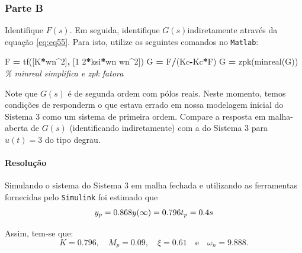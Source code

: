 \documentclass[
]{book}
\newenvironment{Shaded}{\begin{snugshade}}{\end{snugshade}}
\newcommand{\CommentTok}[1]{\textcolor[rgb]{0.56,0.35,0.01}{\textit{#1}}}
\newcommand{\FloatTok}[1]{\textcolor[rgb]{0.00,0.00,0.81}{#1}}
\newcommand{\NormalTok}[1]{#1}
\newcommand{\OperatorTok}[1]{\textcolor[rgb]{0.81,0.36,0.00}{\textbf{#1}}}
\newcommand{\VariableTok}[1]{\textcolor[rgb]{0.00,0.00,0.00}{#1}}
\theoremstyle{definition}
\theoremstyle{definition}
\theoremstyle{definition}
\theoremstyle{remark}
\begin{document}
\hypertarget{parte-b}{%
\subsubsection*{Parte B}\label{parte-b}}

Identifique \(F(s)\). Em seguida, identifique \(G(s)\)indiretamente através da equação \eqref{eq:eq55}. Para isto, utilize os seguintes comandos no \texttt{Matlab}:

\begin{Shaded}
\begin{Highlighting}[]
\VariableTok{F} \OperatorTok{=} \VariableTok{tf}\NormalTok{([}\VariableTok{K}\OperatorTok{*}\VariableTok{wn}\OperatorTok{\^{}}\FloatTok{2}\NormalTok{]}\OperatorTok{,}\NormalTok{ [}\FloatTok{1} \FloatTok{2}\OperatorTok{*}\VariableTok{ksi}\OperatorTok{*}\VariableTok{wn} \VariableTok{wn}\OperatorTok{\^{}}\FloatTok{2}\NormalTok{])}
\VariableTok{G} \OperatorTok{=} \VariableTok{F}\OperatorTok{/}\NormalTok{(}\VariableTok{Kc}\OperatorTok{{-}}\VariableTok{Kc}\OperatorTok{*}\VariableTok{F}\NormalTok{)}
\VariableTok{G} \OperatorTok{=} \VariableTok{zpk}\NormalTok{(}\VariableTok{minreal}\NormalTok{(}\VariableTok{G}\NormalTok{)) }\CommentTok{\% minreal simplifica e zpk fatora}
\end{Highlighting}
\end{Shaded}

Note que \(G(s)\) é de segunda ordem com pólos reais. Neste momento, temos condições de responderm o que estava errado em nossa modelagem inicial do Sistema 3 como um sistema de primeira ordem. Compare a resposta em malha-aberta de \(G(s)\) (identificando indiretamente) com a do Sistema 3 para \(u(t) = 3\) do tipo degrau.

\hypertarget{resoluuxe7uxe3o-3}{%
\paragraph*{Resolução}\label{resoluuxe7uxe3o-3}}

Simulando o sistema do Sistema 3 em malha fechada e utilizando as ferramentas fornecidas pelo \texttt{Simulink} foi estimado que
\[
y_p = 0.868 \\ 
y(\infty) = 0.796 \\ 
t_p = 0.4s
\]

Assim, tem-se que:
\[
K = 0.796, \quad M_p = 0.09, \quad \xi = 0.61 \quad \text{e} \quad \omega_n= 9.888.
\]
\end{document}
